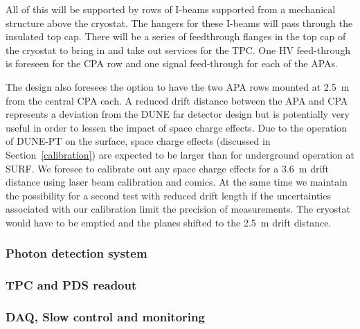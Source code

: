 All of this will be supported by rows of I-beams supported from a mechanical structure above the cryostat.  The hangers for these I-beams will pass through the insulated top cap.  There will be a series of feedthrough flanges in the top cap of the cryostat to bring in and take out services for the TPC.  One HV feed-through is foreseen for the CPA row and one signal feed-through for each of the APAs.

The design also foresees the option to have the two APA rows mounted at 2.5~m from the central CPA each.
A reduced drift distance between the APA and CPA represents a deviation from the DUNE far detector design but is potentially very
useful in order to lessen the impact of space charge effects.
Due to the operation of DUNE-PT on the surface, space charge 
 effects (discussed in Section~\ref{calibration}) are expected to be larger than for underground operation at SURF.
We foresee to calibrate out any space charge effects for a 3.6~m drift distance using laser beam calibration and comics. 
At the same time we maintain the  possibility for a second test with reduced drift length if the uncertainties associated 
with our calibration limit the precision of measurements.
The cryostat would have to be emptied and the planes shifted to the 2.5~m drift distance.
 









\subsubsection{Photon detection system}


\subsubsection{TPC and PDS readout}


\subsubsection{DAQ, Slow control and monitoring}





